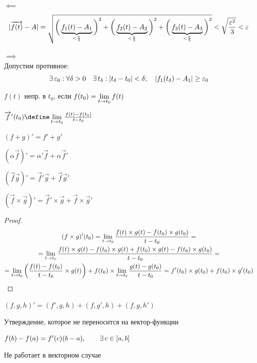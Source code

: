 \begin{iproof}
	\item $ \impliedby $
	$$ |\overrightarrow{f(t)} - A| = \sqrt{\bigg( \underbrace{f_1(t) - A_1}_{< \frac{\varepsilon}3} \bigg)^2 + \bigg(\underbrace{f_2(t) - A_2}_{< \frac{\varepsilon}3} \bigg)^2 + \bigg( \underbrace{f_3(t) - A_3}_{< \frac{\varepsilon}3} \bigg)^2} < \sqrt{\frac{\varepsilon^2}3} < \varepsilon $$
	\item $ \implies $ \\
	Допустим противное:
	$$ \exists\, \varepsilon_0 : \forall \delta > 0 \quad \exists\, t_\delta : |t_\delta - t_0| < \delta; \quad |f_1(t_\delta) - A_1| \ge \varepsilon_0 $$
\end{iproof}

\begin{definition}
	$ f(t) $ непр. в $ t_0 $, если $ f(t_0) = \lim\limits_{t \to t_0} f(t) $
\end{definition}

\begin{definition}
	$ \vec{f}'(t_0) \define \liml{t \to t_0} \frac{f(t) - f(t_0)}{t - t_0} $
\end{definition}

\begin{stmts}
	\item $ (f + g)' = f' + g' $
	\item $ (\alpha \vec{f})' = \alpha'\vec{f} + \alpha \vec{f}' $
	\item $ (\vec{f}\vec{g})' = \vec{f}'\vec{g} + \vec{f}\vec{g}' $
	\item $ (\vec{f} \times \vec{g})' = \vec{f}' \times \vec{g} + \vec{f} \times \vec{g}' $
	\begin{proof}
		\begin{multline*}
			(f \times g)'(t_0) = \lim\limits_{t \to t_0} \frac{f(t) \times g(t) - f(t_0) \times g(t_0)}{t - t_0} = \\
			= \lim\limits_{t \to t_0} \frac{f(t) \times g(t) - f(t_0) \times g(t) + f(t_0) \times g(t) - f(t_0) \times g(t_0)}{t - t_0} = \\
			= \lim\limits_{t \to t_0} \bigg( \frac{f(t) - f(t_0)}{t - t_0} \times g(t) \bigg) + f(t_0) \times \lim\limits_{t \to t_0} \frac{g(t) - g(t_0)}{t - t_0} = f'(t_0) \times g(t_0) + f(t_0) \times g'(t_0)
		\end{multline*}
	\end{proof}
	\item $ (f, g, h)' = (f', g, h) + (f, g', h) + (f, g, h') $
\end{stmts}

\begin{undefthm}{Утверждение, которое не переносится на вектор-функции}
	\begin{theorem}[Лагранжа]
		$ f(b) - f(a) = f'(c)(b - a), \qquad \exists\, c \in [a, b] $
	\end{theorem}
	Не работает в векторном случае
\end{undefthm}

